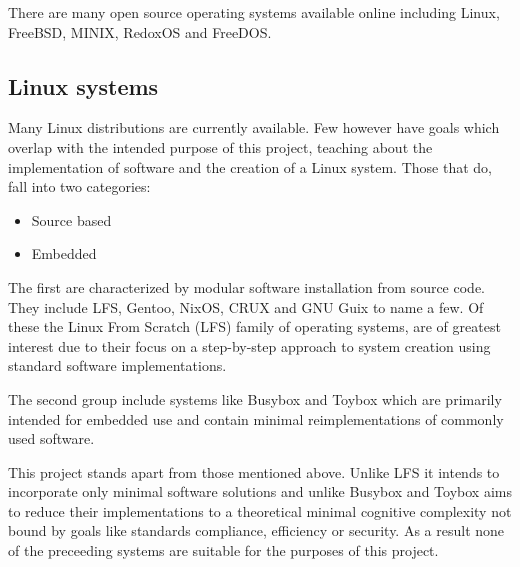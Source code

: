 There are many open source operating systems available online including Linux, FreeBSD, MINIX, RedoxOS and FreeDOS.

\subsection{Linux systems}

Many Linux distributions are currently available. Few however have goals which overlap with the intended purpose of this project, teaching about the implementation of software and the creation of a Linux system. Those that do, fall into two categories:

\begin{itemize}
    \item Source based
    \item Embedded
\end{itemize}

The first are characterized by modular software installation from source code. They include LFS, Gentoo, NixOS, CRUX and GNU Guix to name a few. Of these the Linux From Scratch (LFS) family of operating systems, are of greatest interest due to their focus on a step-by-step approach to system creation using standard software implementations. 

The second group include systems like Busybox and Toybox which are primarily intended for embedded use and contain minimal reimplementations of commonly used software.

This project stands apart from those mentioned above. Unlike LFS it intends to incorporate only minimal software solutions and unlike Busybox and Toybox aims to reduce their implementations to a theoretical minimal cognitive complexity not bound by goals like standards compliance, efficiency or security. As a result none of the preceeding systems are suitable for the purposes of this project.
